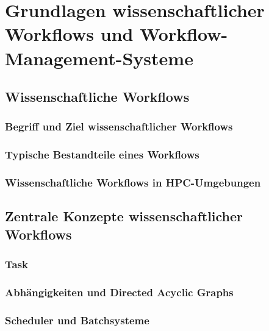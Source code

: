 
\chapter{Grundlagen wissenschaftlicher Workflows und Workflow-Management-Systeme}
\label{sec:basics}

\section{Wissenschaftliche Workflows}
\label{sec:basics:scientific-workflows}

\subsection{Begriff und Ziel wissenschaftlicher Workflows}
\label{sec:basics:scientific-workflows:definition}

\subsection{Typische Bestandteile eines Workflows}
\label{sec:basics:scientific-workflows:components}

\subsection{Wissenschaftliche Workflows in HPC-Umgebungen}
\label{sec:basics:scientific-workflows:hpc}

\section{Zentrale Konzepte wissenschaftlicher Workflows}
\label{sec:basics:concepts}

\subsection{Task}
\label{sec:basics:concepts:task}

\subsection{Abhängigkeiten und Directed Acyclic Graphs}
\label{sec:basics:concepts:dag}

\subsection{Scheduler und Batchsysteme}
\label{sec:basics:concepts:scheduler}

